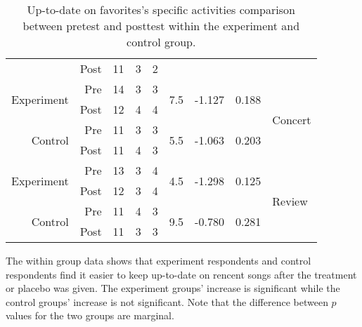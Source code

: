 \begin{table}
\begin{tabular}{rrrrrrrrl}
        &
        Post &
        11 &
        3 &
        2 &
        &
        &
        \\

    \cmidrule(lr){2-8}

      \multirow{2}{*}{Experiment} &
        Pre &
        14 &
        3 &
        3 &
        \multirow{2}{*}{7.5} &
        \multirow{2}{*}{-1.127} &
        \multirow{2}{*}{0.188} &
        \multirow{4}{*}{Concert} \\

        &
        Post &
        12 &
        4 &
        4 &
        &
        &
        \\

      \multirow{2}{*}{Control} &
        Pre &
        11 &
        3 &
        3 &
        \multirow{2}{*}{5.5} &
        \multirow{2}{*}{-1.063} &
        \multirow{2}{*}{0.203} &
        \\

        &
        Post &
        11 &
        4 &
        3 &
        &
        &
        \\

    \cmidrule(lr){2-8}

      \multirow{2}{*}{Experiment} &
        Pre &
        13 &
        3 &
        4 &
        \multirow{2}{*}{4.5} &
        \multirow{2}{*}{-1.298} &
        \multirow{2}{*}{0.125} &
        \multirow{4}{*}{Review} \\

        &
        Post &
        12 &
        3 &
        4 &
        &
        &
        \\

      \multirow{2}{*}{Control} &
        Pre &
        11 &
        4 &
        3 &
        \multirow{2}{*}{9.5} &
        \multirow{2}{*}{-0.780} &
        \multirow{2}{*}{0.281} &
        \\

        &
        Post &
        11 &
        3 &
        3 &
        &
        &
        \\

  \end{tabular}
  \caption[Up-to-date on Favorites' Specific Activities, Within Groups]{%
    Up-to-date on favorites's specific activities comparison between
    pretest and posttest within the experiment and control group.
  }
  \label{table:uptodate.favorite.specific.activities.within}
\end{table}

The within group data shows that experiment respondents and control
respondents find it easier to keep up-to-date on rencent songs after
the treatment or placebo was given. The experiment groups' increase
is significant while the control groups' increase is not significant.
Note that the difference between $p$ values for the two groups
are marginal.

